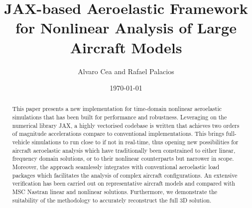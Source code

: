 \documentclass[11pt]{article}
\author{Alvaro Cea and Rafael Palacios}
\date{\today}
\title{JAX-based Aeroelastic Framework for Nonlinear Analysis of Large Aircraft Models}
\begin{document}
\maketitle

\begin{abstract}
This paper presents a new implementation for time-domain nonlinear aeroelastic simulations that has been built for performance and robustness.
Leveraging on the numerical library JAX, a highly vectorised codebase is written that achieves two orders of magnitude accelerations compare to conventional implementations. This brings full-vehicle simulations to run close to if not in real-time, thus opening new possibilities for aircraft aeroelastic analysis which have traditionally been constrained to either linear, frequency domain solutions, or to their nonlinear counterparts but narrower in scope.
Moreover, the approach seamlessly integrates with conventional aeroelastic load packages which facilitates the analysis of complex aircraft configurations.
An extensive verification has been carried out on representative aircraft models and compared with MSC Nastran linear and nonlinear solutions. Furthermore, we demonstrate the suitability of the methodology to accurately reconstruct the full 3D solution. 
\end{abstract}
\end{document}
